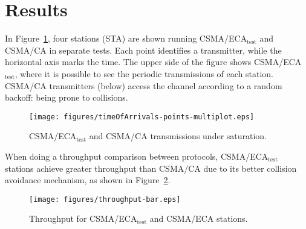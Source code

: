 \documentclass[a4paper,journal]{IEEEtran}
\begin{document}
\section{Results}\label{results}
In Figure~\ref{fig:ECA-test}, four stations (STA) are shown running CSMA/ECA$_{\text{test}}$ and CSMA/CA in separate tests. Each point identifies a transmitter, while the horizontal axis marks the time. The upper side of the figure shows CSMA/ECA$_{\text{test}}$, where it is possible to see the periodic transmissions of each station. CSMA/CA transmitters (below) access the channel according to a random backoff: being prone to collisions. 


	\begin{figure}[htbp]
		\centering
		\texttt{[image: figures/timeOfArrivals-points-multiplot.eps]}
		\caption{CSMA/ECA$_{\text{test}}$ and CSMA/CA transmissions under saturation.}
		\label{fig:ECA-test}
	\end{figure}

When doing a throughput comparison between protocols, CSMA/ECA$_{\text{test}}$ stations achieve greater throughput than CSMA/CA due to its better collision avoidance mechanism, as shown in Figure~\ref{fig:throughput}.

	
	\begin{figure}[htbp]
		\centering
		\texttt{[image: figures/throughput-bar.eps]}
		\caption{Throughput for CSMA/ECA$_{\text{test}}$ and CSMA/ECA stations.}
		\label{fig:throughput}
	\end{figure}
\end{document}
